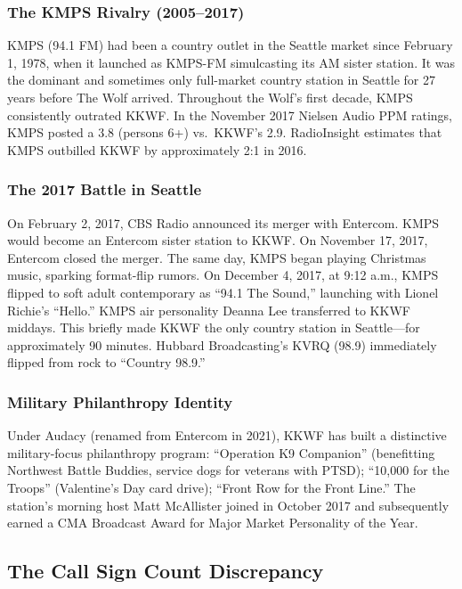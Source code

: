 \documentclass[11pt,letterpaper]{article}
\begin{document}
\subsubsection{The KMPS Rivalry (2005--2017)}

KMPS (94.1 FM) had been a country outlet in the Seattle market since February 1, 1978, when it launched as KMPS-FM simulcasting its AM sister station. It was the dominant and sometimes only full-market country station in Seattle for 27 years before The Wolf arrived. Throughout the Wolf's first decade, KMPS consistently outrated KKWF. In the November 2017 Nielsen Audio PPM ratings, KMPS posted a 3.8 (persons 6+) vs.\ KKWF's 2.9. RadioInsight estimates that KMPS outbilled KKWF by approximately 2:1 in 2016.

\subsubsection{The 2017 Battle in Seattle}

On February 2, 2017, CBS Radio announced its merger with Entercom. KMPS would become an Entercom sister station to KKWF. On November 17, 2017, Entercom closed the merger. The same day, KMPS began playing Christmas music, sparking format-flip rumors. On December 4, 2017, at 9:12 a.m., KMPS flipped to soft adult contemporary as ``94.1 The Sound,'' launching with Lionel Richie's ``Hello.'' KMPS air personality Deanna Lee transferred to KKWF middays. This briefly made KKWF the only country station in Seattle---for approximately 90 minutes. Hubbard Broadcasting's KVRQ (98.9) immediately flipped from rock to ``Country 98.9.''

\subsubsection{Military Philanthropy Identity}

Under Audacy (renamed from Entercom in 2021), KKWF has built a distinctive military-focus philanthropy program: ``Operation K9 Companion'' (benefitting Northwest Battle Buddies, service dogs for veterans with PTSD); ``10,000 for the Troops'' (Valentine's Day card drive); ``Front Row for the Front Line.'' The station's morning host Matt McAllister joined in October 2017 and subsequently earned a CMA Broadcast Award for Major Market Personality of the Year.

\subsection{The Call Sign Count Discrepancy}
\end{document}
